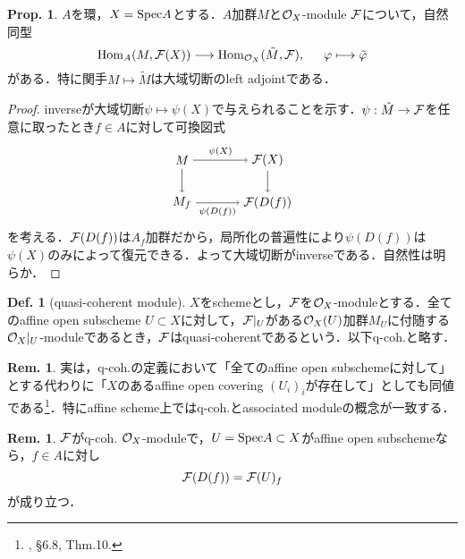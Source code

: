 \documentclass[dvipdfmx,b5paper,papersize]{jsarticle}
\theoremstyle{definition}
\newtheorem{prop}[thm]{Prop.}
\newtheorem{defi}[thm]{Def.}
\newtheorem{rem}[thm]{Rem.}
\begin{document}
\begin{prop}
  $A$を環，$X={\rm Spec}A$とする．$A$加群$M$と${\cal{O}}_X$-module $\cal{F}$について，自然同型
  \[
    {\rm Hom}_A(M,{\cal{F}}(X)) \longrightarrow {\rm Hom}_{{\cal{O}}_X}(\tilde M,\cal{F}),\hspace{15pt} \varphi \longmapsto \tilde \varphi
  \]
  がある．特に関手$M \mapsto \tilde M$は大域切断のleft adjointである．
\end{prop}

\begin{proof}
inverseが大域切断$\psi \longmapsto \psi(X)$で与えられることを示す．$\psi :\tilde M \to \cal{F}$を任意に取ったとき$f \in A$に対して可換図式
\[
  \begin{tikzpicture}[auto,->]
    \node (a) at (0,1.2) {$M$}; \node (x) at (2.4,1.2) {${\cal{F}}(X)$};
    \node (b) at (0,0) {$M_f$}; \node (y) at (2.4,0) {${\cal{F}}(D(f))$};
    \draw (a) -- node {$\scriptstyle \psi(X)$} (x);
    \draw (x) -- node {$\scriptstyle $} (y);
    \draw (a) -- node[swap] {$\scriptstyle $} (b);
    \draw (b) -- node[swap] {$\scriptstyle \psi(D(f))$} (y);
  \end{tikzpicture}
\]
を考える．${\cal{F}}(D(f))$は$A_f$加群だから，局所化の普遍性により$\psi(D(f))$は$\psi(X)$のみによって復元できる．よって大域切断がinverseである．自然性は明らか．
\end{proof}

\begin{defi}[quasi-coherent module]
  $X$をschemeとし，$\cal{F}$を${\cal{O}}_X$-moduleとする．全てのaffine open subscheme $U \subset X$に対して，${\cal{F}}|_U$がある${\cal{O}}_X(U)$加群$M_U$に付随する${\cal{O}}_X|_U$-moduleであるとき，$\cal{F}$はquasi-coherentであるという．以下q-coh.と略す．


\end{defi}

\begin{rem}\label{thm:q-coh.local}
  実は，q-coh.の定義において「全てのaffine open subschemeに対して」とする代わりに「$X$のあるaffine open covering $(U_i)_i$が存在して」としても同値である\footnote{\cite{Bosch}, \S 6.8, Thm.10.}．特にaffine scheme上ではq-coh.とassociated moduleの概念が一致する．
\end{rem}
\begin{rem}
  $\cal{F}$がq-coh. ${\cal{O}}_X$-moduleで，$U={\rm Spec}A \subset X$がaffine open subschemeなら，$f \in A$に対し
  \[
    {\cal{F}}(D(f))={\cal{F}}(U)_f
  \]
  が成り立つ．

\end{rem}
\end{document}
